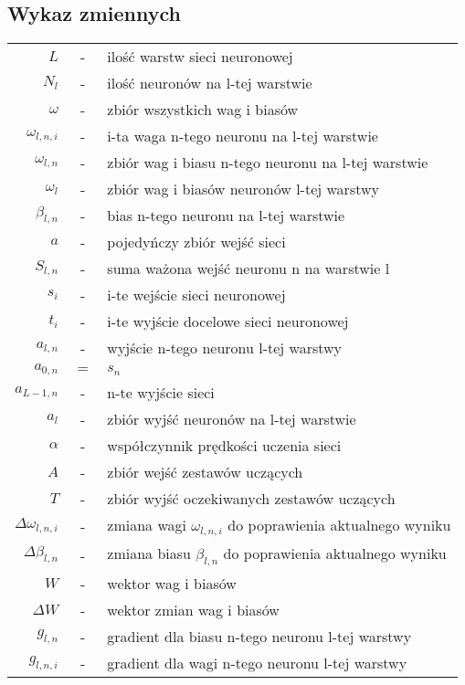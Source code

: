 \documentclass[]{article}
\begin{document}
	\subsection{Wykaz zmiennych}
		\begin{tabular}{rcl}
			$ L $ &-& ilość warstw sieci neuronowej \\
			$ N_{l} $ &-& ilość neuronów na l-tej warstwie \\
			$ \omega $ &-& zbiór wszystkich wag i biasów \\
			$ \omega_{l,n,i} $ &-& i-ta waga n-tego neuronu na l-tej warstwie \\
			$ \omega_{l,n} $ &-& zbiór wag i biasu n-tego neuronu na l-tej warstwie \\
			$ \omega_{l} $ &-& zbiór wag i biasów neuronów l-tej warstwy \\
			$ \beta_{l,n} $ &-& bias n-tego neuronu na l-tej warstwie \\
			$ a $ &-& pojedyńczy zbiór wejść sieci \\
			$ S_{l,n} $ &-& suma ważona wejść neuronu n na warstwie l \\
			$ s_{i} $ &-& i-te wejście sieci neuronowej \\
			$ t_{i} $ &-& i-te wyjście docelowe sieci neuronowej \\
			$ a_{l,n} $ &-& wyjście n-tego neuronu l-tej warstwy \\
			$ a_{0,n} $ &$=$& $ s_{n} $ \\
			$ a_{L-1,n} $ &-& n-te wyjście sieci \\
			$ a_{l} $ &-& zbiór wyjść neuronów na l-tej warstwie \\
			$ \alpha $ &-& współczynnik prędkości uczenia sieci \\
			$ A $ &-& zbiór wejść zestawów uczących \\
			$ T $ &-& zbiór wyjść oczekiwanych zestawów uczących \\
			$ \Delta\omega_{l,n,i} $ &-& zmiana wagi $\omega_{l,n,i}$ do poprawienia aktualnego wyniku \\
			$ \Delta\beta_{l,n} $ &-& zmiana biasu $\beta_{l,n}$ do poprawienia aktualnego wyniku \\
			$ W $ &-& wektor wag i biasów \\
			$ \Delta W $ &-& wektor zmian wag i biasów \\
			$ g_{l,n} $ &-& gradient dla biasu n-tego neuronu l-tej warstwy \\
			$ g_{l,n,i} $ &-& gradient dla wagi n-tego neuronu l-tej warstwy \\
		\end{tabular}
	
\end{document}
